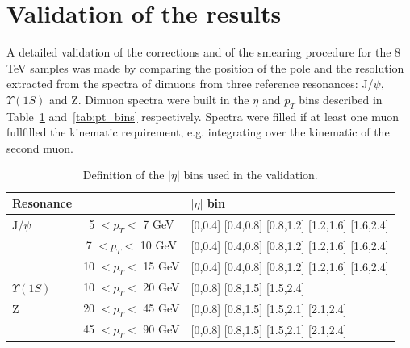 \section{Validation of the results}
A detailed validation of the corrections and
of the smearing procedure for the 8 TeV samples was made by comparing the
position of the pole and the resolution extracted from the spectra of dimuons from
three reference resonances: J/$\psi$, $\Upsilon(1S)$ and Z. 
Dimuon spectra were built in the $\eta$ and $p_T$ bins described in
Table~\ref{tab:eta_bins} and~\ref{tab:pt_bins} respectively. 
Spectra were filled if at least one muon fullfilled the
kinematic requirement, e.g. integrating over the kinematic of the
second muon.
\begin{table}[hbH]
\begin{center}
\caption{Definition of the $|\eta|$ bins used in the validation.\label{tab:eta_bins}}
\begin{tabular}{|l|cl|}
\hline
Resonance & & $|\eta|$ bin \\
\hline
J/$\psi$      &  5  $<p_T<$  7 GeV & [0,0.4] [0.4,0.8] [0.8,1.2] [1.2,1.6] [1.6,2.4] \\
              &  7  $<p_T<$ 10 GeV & [0,0.4] [0.4,0.8] [0.8,1.2] [1.2,1.6] [1.6,2.4] \\
              & 10  $<p_T<$ 15 GeV & [0,0.4] [0.4,0.8] [0.8,1.2] [1.2,1.6] [1.6,2.4] \\
\hline                    
$\Upsilon(1S)$& 10  $<p_T<$ 20 GeV & [0,0.8] [0.8,1.5] [1.5,2.4]\\
\hline                    
Z             & 20  $<p_T<$ 45 GeV & [0,0.8] [0.8,1.5] [1.5,2.1] [2.1,2.4] \\
              & 45  $<p_T<$ 90 GeV & [0,0.8] [0.8,1.5] [1.5,2.1] [2.1,2.4] \\
\hline
\end{tabular}
\end{center}
\end{table}
